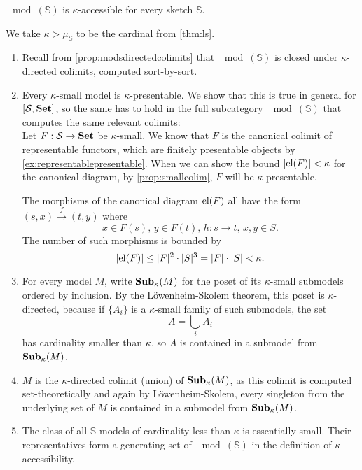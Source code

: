 \begin{Theorem}
$\mod(\mathbb S)$ is $\kappa$-accessible for every sketch $\mathbb S$.
\end{Theorem}
\begin{Proof}
We take $\kappa > \mu_\mathbb S$ to be the cardinal from \ref{thm:ls}.
\begin{enumerate}
\item Recall from \ref{prop:modsdirectedcolimits} that $\mod(\mathbb S)$ is closed under $\kappa$-directed colimits, computed sort-by-sort.
\item Every $\kappa$-small model is $\kappa$-presentable. We show that this is true in general for $[\mathcal{S},\mathbf{Set}]$, so the same has to hold in the full subcategory $\mod(\mathbb S)$ that computes the same relevant colimits: \\

Let $F : \mathcal{S} \to \mathbf{Set}$ be $\kappa$-small. We know that $F$ is the canonical colimit of representable functors, which are finitely presentable objects by \ref{ex:representablepresentable}. When we can show the bound $|\textrm{el}(F)| < \kappa$ for the canonical diagram, by \ref{prop:smallcolim}, $F$ will be $\kappa$-presentable.

The morphisms of the canonical diagram $\textrm{el}(F)$ all have the form $(s,x) \xrightarrow{f} (t,y)$ where
\[ x \in F(s),\, y \in F(t),\, h : s \to t,\, x, y \in S. \]
The number of such morphisms is bounded by
\[ |\textrm{el}(F)| \leq |F|^2 \cdot |S|^3 = |F|\cdot |S| < \kappa. \]

\item For every model $M$, write $\mathbf{Sub}_\kappa(M)$ for the poset of its $\kappa$-small submodels ordered by inclusion. By the Löwenheim-Skolem theorem, this poset is $\kappa$-directed, because if $\{A_i\}$ is a $\kappa$-small family of such submodels, the set
\[ A = \bigcup_i A_i \]
has cardinality smaller than $\kappa$, so $A$ is contained in a submodel from $\mathbf{Sub}_\kappa(M)$.

\item $M$ is the $\kappa$-directed colimit (union) of $\mathbf{Sub}_\kappa(M)$, as this colimit is computed set-theoretically and again by Löwenheim-Skolem, every singleton from the underlying set of $M$ is contained in a submodel from $\mathbf{Sub}_\kappa(M)$. 

\item The class of all $\mathbb S$-models of cardinality less than $\kappa$ is essentially small. Their representatives form a generating set of $\mod(\mathbb S)$ in the definition of $\kappa$-accessibility.
\end{enumerate}
\end{Proof}

